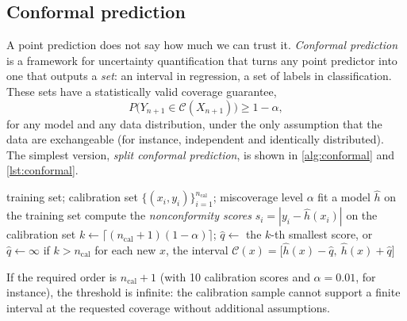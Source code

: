 \subsection{Conformal prediction}

A point prediction does not say how much we can trust it. \emph{Conformal prediction}
\citep{vovk2005algorithmic,angelopoulos2023conformal} is a framework for uncertainty
quantification that turns any point predictor into one that outputs a \emph{set}: an interval
in regression, a set of labels in classification. These sets have a statistically valid
coverage guarantee,
\begin{equation}
  P\bigl(Y_{n+1}\in\mathcal C(X_{n+1})\bigr)\geq1-\alpha,
\end{equation}
for any model and any data distribution, under the only assumption that the data are
exchangeable (for instance, independent and identically distributed). The simplest version,
\emph{split conformal prediction}, is shown in \cref{alg:conformal} and \cref{lst:conformal}.

\begin{algorithm}[htbp]
\caption{Split conformal prediction for regression}\label{alg:conformal}
\begin{algorithmic}[1]
\Require training set; calibration set $\{(x_i,y_i)\}_{i=1}^{n_{\text{cal}}}$; miscoverage level $\alpha$
\State fit a model $\hat h$ on the training set
\State compute the \emph{nonconformity scores} $s_i=|y_i-\hat h(x_i)|$ on the calibration set
\State $k\gets\lceil(n_{\text{cal}}+1)(1-\alpha)\rceil$; $\hat q\gets$ the $k$-th smallest score, or $\hat q\gets\infty$ if $k>n_{\text{cal}}$
\State \Return for each new $x$, the interval $\mathcal C(x)=\bigl[\hat h(x)-\hat q,\ \hat h(x)+\hat q\bigr]$
\end{algorithmic}
\end{algorithm}

If the required order is $n_{\text{cal}}+1$ (with 10 calibration scores and $\alpha=0.01$, for instance), the threshold is
infinite: the calibration sample cannot support a finite interval at the requested coverage without additional
assumptions.

